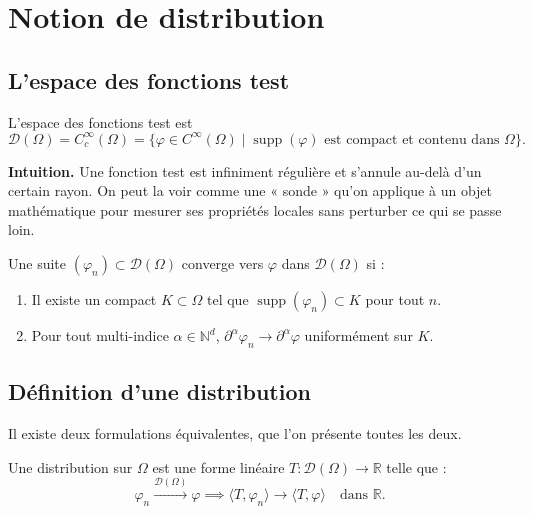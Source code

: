 \documentclass[12pt,a4paper,openany]{book}
\theoremstyle{definition}
\theoremstyle{plain}
\theoremstyle{remark}
\begin{document}
	\chapter{Notion de distribution}
	

	
	\section{L'espace des fonctions test}
	
	\begin{definition}
		L'espace des fonctions test est
		\[
		\mathcal{D}(\Omega) = C_c^{\infty}(\Omega) = \{ \varphi \in C^{\infty}(\Omega) \mid \operatorname{supp}(\varphi) \text{ est compact et contenu dans } \Omega \}.
		\]
	\end{definition}
	
	\textbf{Intuition.} Une fonction test est infiniment régulière et s'annule au-delà d'un certain rayon. On peut la voir comme une « sonde » qu'on applique à un objet mathématique pour mesurer ses propriétés locales sans perturber ce qui se passe loin.
	
	\begin{definition}
		Une suite $(\varphi_n) \subset \mathcal{D}(\Omega)$ converge vers $\varphi$ dans $\mathcal{D}(\Omega)$ si :
		\begin{enumerate}
			\item[(i)] Il existe un compact $K \subset \Omega$ tel que $\operatorname{supp}(\varphi_n) \subset K$ pour tout $n$.
			\item[(ii)] Pour tout multi-indice $\alpha \in \mathbb{N}^d$, $\partial^\alpha \varphi_n \to \partial^\alpha \varphi$ uniformément sur $K$.
		\end{enumerate}
	\end{definition}
	
	\section{Définition d'une distribution}
	
	Il existe deux formulations équivalentes, que l'on présente toutes les deux.
	
	\begin{definition}
		Une distribution sur $\Omega$ est une forme linéaire $T : \mathcal{D}(\Omega) \to \mathbb{R}$ telle que :
		\[
		\varphi_n \xrightarrow{\mathcal{D}(\Omega)} \varphi \implies \langle T, \varphi_n \rangle \to \langle T, \varphi \rangle \quad \text{dans } \mathbb{R}.
		\]
	\end{definition}
	
\end{document}
